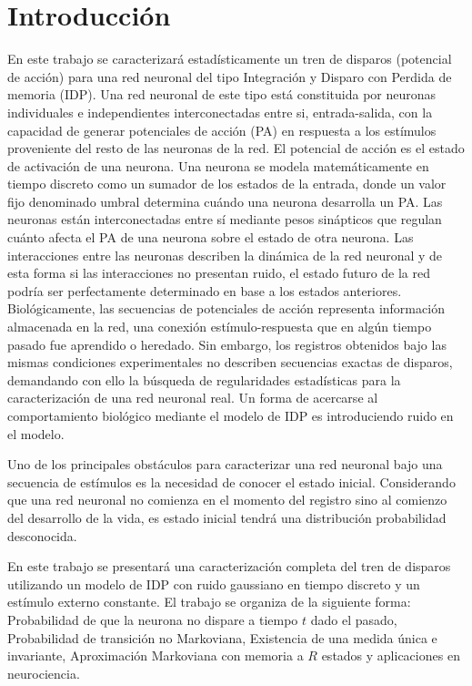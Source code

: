 \section{Introducción}
En este trabajo se caracterizará estadísticamente un tren de disparos (potencial de acción) para una red neuronal del tipo Integración y Disparo con Perdida de memoria (IDP). Una red neuronal de este tipo está constituida por neuronas individuales e independientes interconectadas entre si, entrada-salida, con la capacidad de generar potenciales de acción (PA) en respuesta a los estímulos proveniente del resto de las neuronas de la red. El potencial de acción es el estado de activación de una neurona. Una neurona se modela matemáticamente en tiempo discreto como un sumador de los estados de la entrada, donde un valor fijo denominado umbral determina cuándo una neurona desarrolla un PA. Las neuronas están interconectadas entre sí mediante pesos sinápticos que regulan cuánto afecta el PA de una neurona sobre el estado de otra neurona. Las interacciones entre las neuronas describen la dinámica de la red neuronal y de esta forma si las interacciones no presentan ruido, el estado futuro de la red podría ser perfectamente determinado en base a los estados anteriores. Biológicamente, las secuencias de potenciales de acción representa información almacenada en la red, una conexión estímulo-respuesta que en algún tiempo pasado fue aprendido o heredado. Sin embargo, los registros obtenidos bajo las mismas condiciones experimentales no describen secuencias exactas de disparos, demandando con ello la búsqueda de regularidades estadísticas para la caracterización de una red neuronal real. Un forma de acercarse al comportamiento biológico mediante el modelo de IDP es introduciendo ruido en el modelo. 

Uno de los principales obstáculos para caracterizar una red neuronal bajo una secuencia de estímulos es la necesidad de conocer el estado inicial. Considerando que una red neuronal no comienza en el momento del registro sino al comienzo del desarrollo de la vida, es estado inicial tendrá una distribución probabilidad desconocida.

En este trabajo se presentará una caracterización completa del tren de disparos utilizando un modelo de IDP con ruido gaussiano en tiempo discreto y un estímulo externo constante. El trabajo se organiza de la siguiente forma: Probabilidad de que la neurona no dispare a tiempo $t$ dado el pasado, Probabilidad de transición no Markoviana, Existencia de una medida única e invariante, Aproximación Markoviana con memoria a $R$ estados y aplicaciones en neurociencia. 